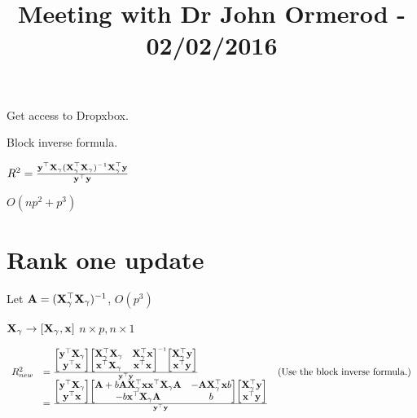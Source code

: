 \documentclass{amsart}
\title{Meeting with Dr John Ormerod - 02/02/2016}
\begin{document}
\maketitle

Get access to Dropxbox.

Block inverse formula.

$R^2 = \frac{{\bf y}^\top {\bf X}_\gamma ({\bf X}_\gamma^\top {\bf X}_\gamma)^{-1} {\bf X}_\gamma^\top {\bf y}}{{\bf y}^\top {\bf y}}$

$O(np^2 + p^3)$

\section{Rank one update}

Let ${\bf A} = ({\bf X}_\gamma^\top {\bf X}_\gamma)^{-1}$, $O(p^3)$

${\bf X}_\gamma \to [{\bf X}_\gamma, {\bf x}]$
$n \times p, n \times 1$

\begin{equation*}
\begin{array}{lll}
R^2_{new} &= \frac{
\begin{bmatrix}
{\bf y}^\top {\bf X}_\gamma \\
{\bf y}^\top {\bf x}
\end{bmatrix}
\begin{bmatrix}
{\bf X}_\gamma^\top {\bf X}_\gamma & {\bf X}_\gamma^\top {\bf x} \\
{\bf x}^\top {\bf X}_\gamma & {\bf x}^\top {\bf x}
\end{bmatrix}^{-1}
\begin{bmatrix}
{\bf X}_\gamma^\top {\bf y} \\
{\bf x}^\top {\bf y}
\end{bmatrix}
}{{\bf y}^\top {\bf y}} & \text{(Use the block inverse formula.)} \\
&= \frac{
\begin{bmatrix}
{\bf y}^\top {\bf X}_\gamma \\
{\bf y}^\top {\bf x}
\end{bmatrix}
\begin{bmatrix}
{\bf A} + b {\bf A} {\bf X}_\gamma^\top {\bf x} {\bf x}^\top {\bf X}_\gamma {\bf A} & -{\bf A} {\bf X}_\gamma^\top {\bf x} b \\
-b {\bf x}^\top {\bf X}_\gamma {\bf A} & b
\end{bmatrix}
\begin{bmatrix}
{\bf X}_\gamma^\top {\bf y} \\
{\bf x}^\top {\bf y}
\end{bmatrix}
}{{\bf y}^\top {\bf y}}
\end{array}
\end{equation*}
\end{document}
